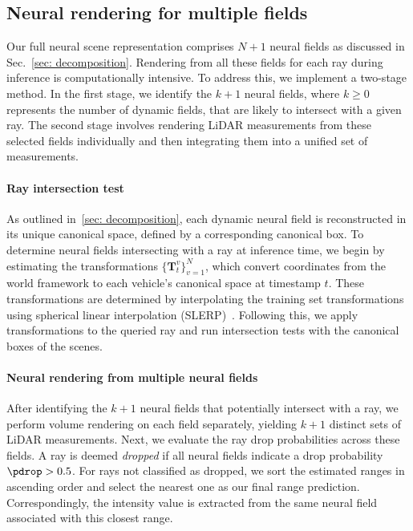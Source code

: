 \subsection{Neural rendering for multiple fields}\label{sec:neural_fields_composition}
Our full neural scene representation comprises $N+1$ neural fields as discussed in Sec.~\ref{sec: decomposition}. Rendering from all these fields for each ray during inference is computationally intensive. To address this, we implement a two-stage method. In the first stage, we identify the $k+1$ neural fields, where $k \geq 0$ represents the number of dynamic fields, that are likely to intersect with a given ray. The second stage involves rendering LiDAR measurements from these selected fields individually and then integrating them into a unified set of measurements.


\paragraph{Ray intersection test}
As outlined in~\cref{sec: decomposition}, each dynamic neural field is reconstructed in its unique canonical space, defined by a corresponding canonical box. To determine neural fields intersecting with a ray at inference time, we begin by estimating the transformations $\{\mathbf{T}_t^v\}_{v=1}^N$, which convert coordinates from the world framework to each vehicle's canonical space at timestamp $t$. These transformations are determined by interpolating the training set transformations using spherical linear interpolation (SLERP)~\cite{10.1145/325334.325242}. Following this, we apply transformations to the queried ray and run intersection tests with the canonical boxes of the scenes. 


\paragraph{Neural rendering from multiple neural fields}
 After identifying the $k+1$ neural fields that potentially intersect with a ray, we perform volume rendering on each field separately, yielding $k+1$ distinct sets of LiDAR measurements. Next, we evaluate the ray drop probabilities across these fields. A ray is deemed \textit{dropped} if all neural fields indicate a drop probability $\pdrop > 0.5$. For rays not classified as dropped, we sort the estimated ranges in ascending order and select the nearest one as our final range prediction. Correspondingly, the intensity value is extracted from the same neural field associated with this closest range.
